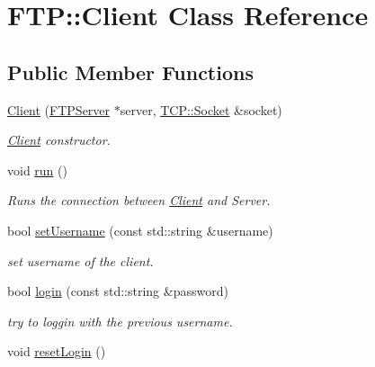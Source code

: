 \hypertarget{class_f_t_p_1_1_client}{\section{F\-T\-P\-:\-:Client Class Reference}
\label{class_f_t_p_1_1_client}
}
\subsection*{Public Member Functions}
\begin{DoxyCompactItemize}
\item 
\hyperlink{class_f_t_p_1_1_client_ab611529ac304de5e847df898306b7408}{Client} (\hyperlink{class_f_t_p_1_1_f_t_p_server}{F\-T\-P\-Server} $\ast$server, \hyperlink{class_f_t_p_1_1_t_c_p_1_1_socket}{T\-C\-P\-::\-Socket} \&socket)
\begin{DoxyCompactList}\small\item\em \hyperlink{class_f_t_p_1_1_client}{Client} constructor. \end{DoxyCompactList}\item 
void \hyperlink{class_f_t_p_1_1_client_a260407a0f8d8fe5c7c26b68b5ac2443b}{run} ()
\begin{DoxyCompactList}\small\item\em Runs the connection between \hyperlink{class_f_t_p_1_1_client}{Client} and Server. \end{DoxyCompactList}\item 
\hypertarget{class_f_t_p_1_1_client_a5423cfaf6fc6242ad010c8605df143df}{bool \hyperlink{class_f_t_p_1_1_client_a5423cfaf6fc6242ad010c8605df143df}{set\-Username} (const std\-::string \&username)}\label{class_f_t_p_1_1_client_a5423cfaf6fc6242ad010c8605df143df}

\begin{DoxyCompactList}\small\item\em set username of the client. \end{DoxyCompactList}\item 
bool \hyperlink{class_f_t_p_1_1_client_abfdc9020e33df97a728211b81097113f}{login} (const std\-::string \&password)
\begin{DoxyCompactList}\small\item\em try to loggin with the previous username. \end{DoxyCompactList}\item 
\hypertarget{class_f_t_p_1_1_client_a9d09db3246bb37ee6cd1cb48ae48ec67}{void \hyperlink{class_f_t_p_1_1_client_a9d09db3246bb37ee6cd1cb48ae48ec67}{reset\-Login} ()}\label{class_f_t_p_1_1_client_a9d09db3246bb37ee6cd1cb48ae48ec67}


\end{DoxyCompactItemize}
